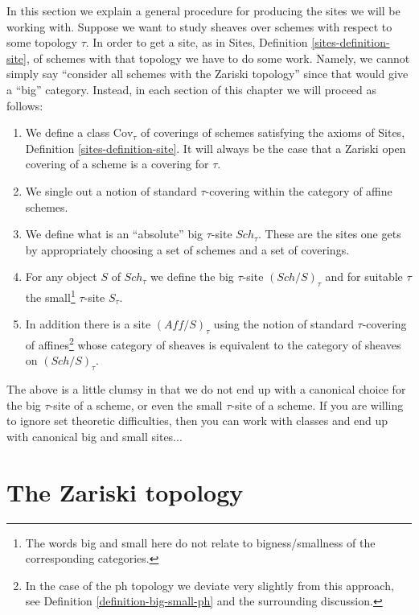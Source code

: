 \documentclass{stacks-project}
\theoremstyle{plain}
\theoremstyle{definition}
\theoremstyle{remark}
\numberwithin{equation}{subsection}
\def\Sch{\mathit{Sch}}
\begin{document}
\noindent
In this section we explain a general procedure for producing the
sites we will be working with. Suppose we want to study sheaves
over schemes with respect to some topology $\tau$. In order to
get a site, as in Sites, Definition \ref{sites-definition-site},
of schemes with that topology we have to do some work. Namely,
we cannot simply say ``consider all schemes with the Zariski topology''
since that would give a ``big'' category. Instead, in each section of
this chapter we will proceed as follows:
\begin{enumerate}
\item We define a class $\text{Cov}_\tau$ of coverings of schemes
satisfying the axioms of Sites, Definition \ref{sites-definition-site}.
It will always be the case that a Zariski open covering of
a scheme is a covering for $\tau$.
\item We single out a notion of standard
$\tau$-covering within the category of affine schemes.
\item We define what is an ``absolute'' big $\tau$-site $\Sch_\tau$.
These are the sites one gets by appropriately choosing a set of schemes
and a set of coverings.
\item For any object $S$ of $\Sch_\tau$
we define the big $\tau$-site $(\Sch/S)_\tau$ and for suitable
$\tau$ the small\footnote{The words big and
small here do not relate to bigness/smallness of the corresponding
categories.} $\tau$-site $S_\tau$.
\item In addition there is a site $(\textit{Aff}/S)_\tau$ using the
notion of standard $\tau$-covering of affines\footnote{In the case
of the ph topology we deviate very slightly from this approach, see
Definition \ref{definition-big-small-ph} and the surrounding discussion.}
whose category of sheaves
is equivalent to the category of sheaves on $(\Sch/S)_\tau$.
\end{enumerate}
The above is a little clumsy in that we do not end up with a canonical
choice for the big $\tau$-site of a scheme, or even the small
$\tau$-site of a scheme. If you are willing to ignore set theoretic
difficulties, then you can work with classes and end up with
canonical big and small sites...







\section{The Zariski topology}
\label{section-zariski}
\end{document}
